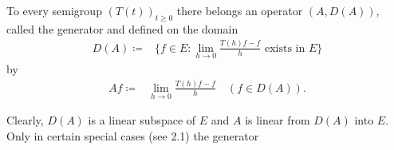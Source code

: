 \begin{definition}\label{def:a1-1.5}
To every semigroup $(T(t))_{t \geq 0}$ there belongs an operator $(A,D(A))$, called the generator and defined on the domain
\begin{align*}
	D(A) \coloneqq{} & \{f \in E \colon \lim_{h\to0} \frac{T(h)f - f}{h} \text{ exists in } E\}
\end{align*}
by
\begin{align*}
	Af \coloneqq{} & \lim_{h\to0} \frac{T(h)f - f}{h} \quad (f \in D(A)).
\end{align*}
\end{definition}
Clearly, $D(A)$ is a linear subspace of $E$ and $A$ is linear from $D(A)$ into $E$.
Only in certain special cases (see 2.1) the generator
\newpage


\newpage
